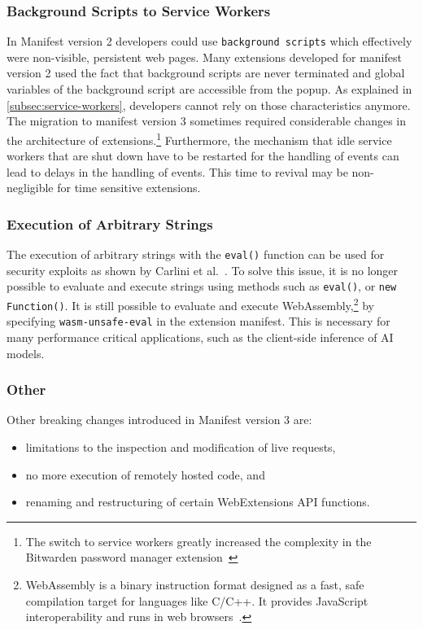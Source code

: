 \subsubsection{Background Scripts to Service Workers}
In Manifest version 2 developers could use \verb|background scripts| which effectively were non-visible, persistent web pages.
Many extensions developed for manifest version 2 used the fact that background scripts are never terminated and global variables of the background script are accessible from the popup.
As explained in \cref{subsec:service-workers}, developers cannot rely on those characteristics anymore.
The migration to manifest version 3 sometimes required considerable changes in the architecture of extensions.\footnote{
The switch to service workers greatly increased the complexity in the Bitwarden password manager extension~\cite{gonzalez2024bitwarden}}
Furthermore, the mechanism that idle service workers that are shut down have to be restarted for the handling of events can lead to delays in the handling of events.
This time to revival may be non-negligible for time sensitive extensions.

\subsubsection{Execution of Arbitrary Strings}
The execution of arbitrary strings with the \verb|eval()| function can be used for security exploits as shown by Carlini et al.~\cite{carlini2012evaluation}.
To solve this issue, it is no longer possible to evaluate and execute strings using methods such as \verb|eval()|, or \verb|new Function()|.
It is still possible to evaluate and execute WebAssembly,\footnote{WebAssembly is a binary instruction format designed as a fast, safe compilation target for languages like C/C++. It provides JavaScript interoperability and runs in web browsers~\cite{haas2017wasm}.} by specifying \verb|wasm-unsafe-eval| in the extension manifest.
This is necessary for many performance critical applications, such as the client-side inference of AI models.

\subsubsection{Other}
Other breaking changes introduced in Manifest version 3 are:
\begin{itemize}
    \item limitations to the inspection and modification of live requests,
    \item no more execution of remotely hosted code, and
    \item renaming and restructuring of certain WebExtensions API functions.
\end{itemize}

